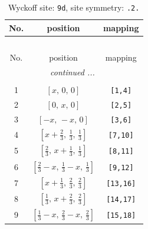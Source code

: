 \documentclass[fleqn,8pt]{jsarticle}
\begin{document}
\begin{longtable}{ccc}
\caption{Wyckoff site: {\tt 9d}, site symmetry: {\tt .2.}}
 \\
 \hline \hline
No. & position & mapping \\ \hline \endfirsthead

\multicolumn{2}{l}{\tablename\ \thetable{}} \\
 \hline \hline
No. & position & mapping \\ \hline \endhead

 \hline \hline
\multicolumn{2}{r}{\footnotesize\it continued ...} \\ \endfoot

 \hline \hline
\multicolumn{2}{r}{} \\ \endlastfoot

1 & $\left[ x,\, 0,\, 0 \right]$ & {\tt [1,4]} \\ \hline
2 & $\left[ 0,\, x,\, 0 \right]$ & {\tt [2,5]} \\ \hline
3 & $\left[ - x,\, - x,\, 0 \right]$ & {\tt [3,6]} \\ \hline
4 & $\left[ x + \frac{2}{3},\, \frac{1}{3},\, \frac{1}{3} \right]$ & {\tt [7,10]} \\ \hline
5 & $\left[ \frac{2}{3},\, x + \frac{1}{3},\, \frac{1}{3} \right]$ & {\tt [8,11]} \\ \hline
6 & $\left[ \frac{2}{3} - x,\, \frac{1}{3} - x,\, \frac{1}{3} \right]$ & {\tt [9,12]} \\ \hline
7 & $\left[ x + \frac{1}{3},\, \frac{2}{3},\, \frac{2}{3} \right]$ & {\tt [13,16]} \\ \hline
8 & $\left[ \frac{1}{3},\, x + \frac{2}{3},\, \frac{2}{3} \right]$ & {\tt [14,17]} \\ \hline
9 & $\left[ \frac{1}{3} - x,\, \frac{2}{3} - x,\, \frac{2}{3} \right]$ & {\tt [15,18]} \\
\end{longtable}
\renewcommand{\arraystretch}{1.2}
\end{document}
